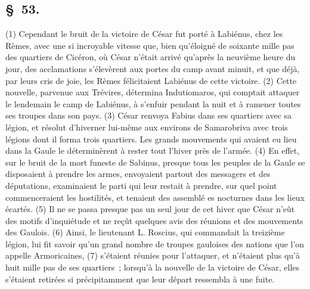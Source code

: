 \documentclass[french,twoside]{book} %
\begin{document}
\subsection[{§ 53.}]{ \textsc{§ 53.} }
\noindent (1) Cependant le bruit de la victoire de César fut porté à Labiénus, chez les Rèmes, avec une si incroyable vitesse que, bien qu’éloigné de soixante mille pas des quartiers de Cicéron, où César n’était arrivé qu’après la neuvième heure du jour, des acclamations s’élevèrent aux portes du camp avant minuit, et que déjà, par leurs cris de joie, les Rèmes félicitaient Labiénus de cette victoire. (2) Cette nouvelle, parvenue aux Trévires, détermina Indutiomaros, qui comptait attaquer le lendemain le camp de Labiénus, à s’enfuir pendant la nuit et à ramener toutes ses troupes dans son pays. (3) César renvoya Fabius dans ses quartiers avec sa légion, et résolut d’hiverner lui-même aux environs de Samarobriva avec trois légions dont il forma trois quartiers. Les grands mouvements qui avaient eu lieu dans la Gaule le déterminèrent à rester tout l’hiver près de l’armée. (4) En effet, sur le bruit de la mort funeste de Sabinus, presque tous les peuples de la Gaule se disposaient à prendre les armes, envoyaient partout des messagers et des députations, examinaient le parti qui leur restait à prendre, sur quel point commenceraient les hostilités, et tenaient des assemblé es nocturnes dans les lieux écartés. (5) Il ne se passa presque pas un seul jour de cet hiver que César n’eût des motifs d’inquiétude et ne reçût quelques avis des réunions et des mouvements des Gaulois. (6) Ainsi, le lieutenant L. Roscius, qui commandait la treizième légion, lui fit savoir qu’un grand nombre de troupes gauloises des nations que l’on appelle Armoricaines, (7) s’étaient réunies pour l’attaquer, et n’étaient plus qu’à huit mille pas de ses quartiers ; lorsqu’à la nouvelle de la victoire de César, elles s’étaient retirées si précipitamment que leur départ ressembla à une fuite.
\end{document}

